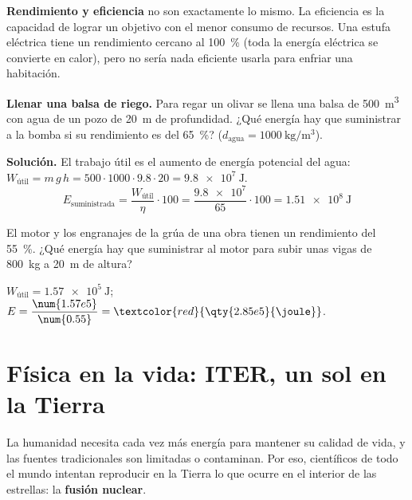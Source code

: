 \begin{remark}
    \textbf{Rendimiento y eficiencia} no son exactamente lo mismo. La eficiencia es la capacidad de lograr un objetivo con el menor
    consumo de recursos. Una estufa eléctrica tiene un rendimiento cercano al \qty{100}{\percent} (toda la energía eléctrica se
    convierte en calor), pero no sería nada eficiente usarla para enfriar una habitación.
\end{remark}

\begin{example}
    \textbf{Llenar una balsa de riego.} Para regar un olivar se llena una balsa de \qty{500}{\m\cubed} con agua de un pozo de
    \qty{20}{\m} de profundidad. ¿Qué energía hay que suministrar a la bomba si su rendimiento es del \qty{65}{\percent}?
    (\(d_{\text{agua}} = \qty{1000}{\kg\per\m\cubed}\)).

    \textbf{Solución.} El trabajo útil es el aumento de energía potencial del agua:
    \(W_{\text{útil}} = m\,g\,h = 500 \cdot 1000 \cdot \num{9.8} \cdot 20 = \qty{9.8e7}{\joule}\).
    \[ E_{\text{suministrada}} = \frac{W_{\text{útil}}}{\eta} \cdot 100 = \frac{\num{9.8e7}}{65} \cdot 100 = \qty{1.51e8}{\joule} \]
\end{example}

\begin{exercise}
    El motor y los engranajes de la grúa de una obra tienen un rendimiento del \qty{55}{\percent}. ¿Qué energía hay que suministrar
    al motor para subir unas vigas de \qty{800}{\kg} a \qty{20}{\m} de altura?
    \begin{solu}
        \(W_{\text{útil}} = \qty{1.57e5}{\joule}\); \(E = \dfrac{\num{1.57e5}}{\num{0.55}} = \textcolor{red}{\qty{2.85e5}{\joule}}\).
    \end{solu}
\end{exercise}

\section{Física en la vida: ITER, un sol en la Tierra}\label{sec:ud12-iter}

La humanidad necesita cada vez más energía para mantener su calidad de vida, y las fuentes tradicionales son limitadas o contaminan.
Por eso, científicos de todo el mundo intentan reproducir en la Tierra lo que ocurre en el interior de las estrellas: la \textbf{fusión
nuclear}.

